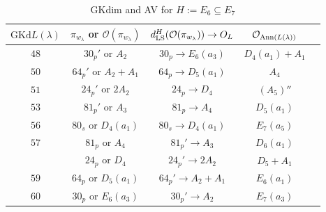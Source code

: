 \documentclass[reqno,12pt]{amsart}
\numberwithin{equation}{section}
\theoremstyle{plain}
\theoremstyle{definition}
\newcommand{\lam}{\lambda}
\renewcommand{\subset}{\subseteq}
\begin{document}
\begin{table}[htbp]\caption{ GKdim and AV for $H:=E_6\subset E_7$}\label{tabe6}
	\centering
	\renewcommand{\arraystretch}{1.5}
	\setlength\tabcolsep{5pt}
	
{	\begin{tabular}{|c|c|c|c|c|}
		\hline $\mathrm{GKd} L(\lambda)$ & ${\pi_{w_{\lam}}}$ or    $\mathcal{O}({\pi_{w_{\lam}}})$& $d_{\rm LS}^{H}(\mathcal{O}(\pi_{w_\lambda}))\rightarrow O_{L}$ & $\mathcal{O}_{{\rm Ann}(L(\lambda))}$ \\ \hline

$48$ 
&  $ 30_p'$ or $A_2$ & $30_p \rightarrow E_6(a_3)$  &   $D_4(a_1)+A_1$ \\
\hline



$50$ 
&  $ 64_p'$ or $A_2+A_1$ & $64_p \rightarrow D_5(a_1)$  &   $A_4$ \\
\hline



$51$ 
&  $ 24_p'$ or $2A_2$ & $24_p \rightarrow D_4$  &   $(A_5)''$ \\
\hline

$53$ 
&  $ 81_p'$ or $A_3$ & $81_p \rightarrow A_4$  &   $D_5(a_1)$ \\
\hline

$56$ 
&  $ 80_s$ or $D_4(a_1)$ & $80_s \rightarrow D_4(a_1)$  &   $E_7(a_5)$ \\
\hline




$57$ 
&  $ 81_p$ or $A_4$ & $81_{p}'\rightarrow A_3$  &   $D_6(a_1)$ \\
&  $ 24_p$ or $D_4$ & $24_{p}'\rightarrow 2A_2$  &   $D_5+A_1$ \\
\hline

$59$ 
&  $ 64_p$ or $D_5(a_1)$ & $64_{p}'\rightarrow A_2+A_1$  &   $E_6(a_1)$ \\
\hline

$60$ 
&  $ 30_p$ or $E_6(a_3)$ & $30_{p}'\rightarrow A_2$  &   $E_7(a_3)$ \\
\hline



\end{tabular}}
	\bigskip
	
	
\end{table}
\end{document}
